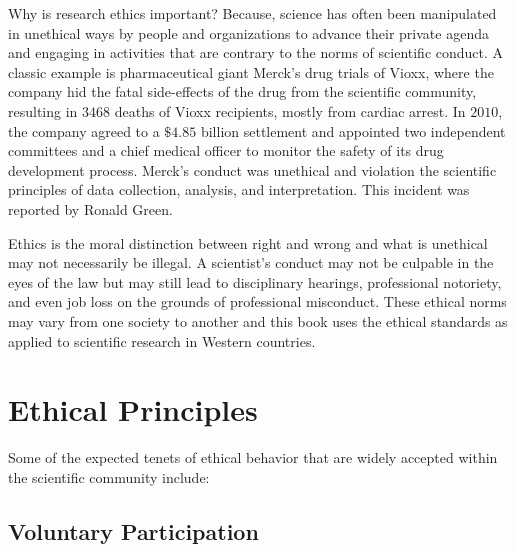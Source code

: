 Why is research ethics important? Because, science has often been manipulated in unethical ways by people and organizations to advance their private agenda and engaging in activities that are contrary to the norms of scientific conduct. A classic example is pharmaceutical giant Merck’s drug trials of Vioxx, where the company hid the fatal side-effects of the drug from the scientific community, resulting in $ 3468 $ deaths of Vioxx recipients, mostly from cardiac arrest. In $ 2010 $, the company agreed to a $ \$4.85 $ billion settlement and appointed two independent committees and a chief medical officer to monitor the safety of its drug development process. Merck's conduct was unethical and violation the scientific principles of data collection, analysis, and interpretation. This incident was reported by Ronald Green\cite{green2006direct}.

Ethics is the moral distinction between right and wrong and what is unethical may not necessarily be illegal. A scientist's conduct may not be culpable in the eyes of the law but may still lead to disciplinary hearings, professional notoriety, and even job loss on the grounds of professional misconduct. These ethical norms may vary from one society to another and this book uses the ethical standards as applied to scientific research in Western countries.

\section{Ethical Principles}

Some of the expected tenets of ethical behavior that are widely accepted within the scientific community include:

\subsection{Voluntary Participation}

